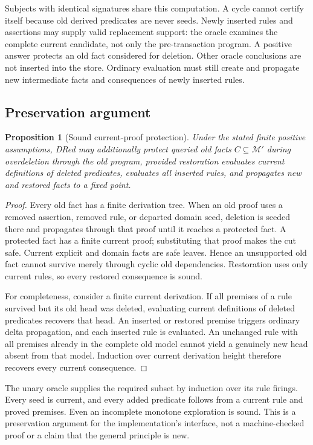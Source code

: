 \documentclass{article}
\newtheorem{proposition}{Proposition}
\begin{document}
Subjects with identical signatures share this computation. A cycle cannot
certify itself because old derived predicates are never seeds. Newly inserted
rules and assertions may supply valid replacement support: the oracle examines
the complete current candidate, not only the pre-transaction program. A positive
answer protects an old fact considered for deletion. Other oracle conclusions
are not inserted into the store. Ordinary evaluation must still create and
propagate new intermediate facts and consequences of newly inserted rules.

\subsection{Preservation argument}
\begin{proposition}[Sound current-proof protection]
Under the stated finite positive assumptions, DRed may additionally protect
queried old facts $C\subseteq\mathcal M'$ during overdeletion through the old
program, provided restoration evaluates current definitions of deleted
predicates, evaluates all inserted rules, and propagates new and restored facts
to a fixed point.
\end{proposition}
\begin{proof}
Every old fact has a finite derivation tree. When an old proof uses a removed
assertion, removed rule, or departed domain seed, deletion is seeded there and
propagates through that proof until it reaches a protected fact. A protected
fact has a finite current proof; substituting that proof makes the cut safe.
Current explicit and domain facts are safe leaves. Hence an unsupported old
fact cannot survive merely through cyclic old dependencies. Restoration uses
only current rules, so every restored consequence is sound.

For completeness, consider a finite current derivation. If all premises of a
rule survived but its old head was deleted, evaluating current definitions of
deleted predicates recovers that head. An inserted or restored premise triggers
ordinary delta propagation, and each inserted rule is evaluated. An unchanged
rule with all premises already in the complete old model cannot yield a
genuinely new head absent from that model. Induction over current derivation
height therefore recovers every current consequence.
\end{proof}

The unary oracle supplies the required subset by induction over its rule
firings. Every seed is current, and every added predicate follows from a
current rule and proved premises. Even an incomplete monotone exploration is
sound. This is a preservation argument for the implementation's interface,
not a machine-checked proof or a claim that the general principle is new.
\end{document}
